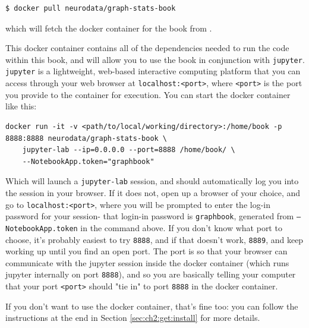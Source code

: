 \begin{lstlisting}[style=bash]
$ docker pull neurodata/graph-stats-book
\end{lstlisting}

which will fetch the docker container for the book from \cite{thisbookdocker}.

This docker container contains all of the dependencies needed to run the code within this book, and will allow you to use the book in conjunction with \texttt{jupyter}. \texttt{jupyter} is a lightweight, web-based interactive computing platform that you can access through your web browser at \texttt{localhost:<port>}, where \texttt{<port>} is the port you provide to the container for execution. You can start the docker container like this:


\begin{lstlisting}[style=bash]
docker run -it -v <path/to/local/working/directory>:/home/book -p 8888:8888 neurodata/graph-stats-book \
    jupyter-lab --ip=0.0.0.0 --port=8888 /home/book/ \
    --NotebookApp.token="graphbook"
\end{lstlisting}

Which will launch a \texttt{jupyter-lab} session, and {should} automatically log you into the session in your browser. If it does not, open up a browser of your choice, and go to \texttt{localhost:<port>}, where you will be prompted to enter the log-in password for your session- that login-in password is \texttt{graphbook}, generated from \texttt{--NotebookApp.token} in the command above. If you don't know what port to choose, it's probably easiest to try \texttt{8888}, and if that doesn't work, \texttt{8889}, and keep working up until you find an open port. The port is so that your browser can communicate with the jupyter session inside the docker container (which runs jupyter internally on port \texttt{8888}), and so you are basically telling your computer that your port \texttt{<port>} should "tie in" to port \texttt{8888} in the docker container.

If you don't want to use the docker container, that's fine too: you can follow the instructions at the end in Section \ref{sec:ch2:get:install} for more details. 

